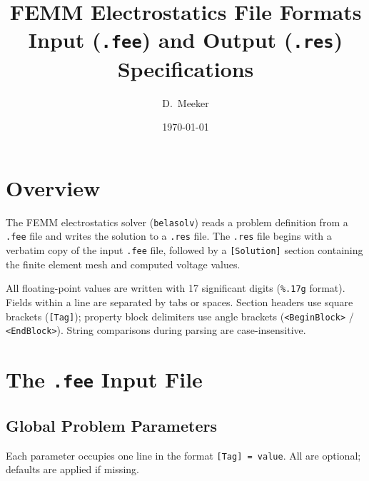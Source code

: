 \documentclass[11pt]{article}
\title{FEMM Electrostatics File Formats\\[0.5em]
\large Input (\texttt{.fee}) and Output (\texttt{.res}) Specifications}
\author{D.\ Meeker}
\date{\today}
\begin{document}
\maketitle
\tableofcontents
\newpage

\section{Overview}

The FEMM electrostatics solver (\texttt{belasolv}) reads a problem
definition from a \texttt{.fee} file and writes the solution to a
\texttt{.res} file.  The \texttt{.res} file begins with a verbatim
copy of the input \texttt{.fee} file, followed by a \texttt{[Solution]}
section containing the finite element mesh and computed voltage values.

All floating-point values are written with 17 significant digits
(\verb|%.17g| format).  Fields within a line are separated by tabs or
spaces.  Section headers use square brackets (\verb|[Tag]|); property
block delimiters use angle brackets (\verb|<BeginBlock>| /
\verb|<EndBlock>|).  String comparisons during parsing are
case-insensitive.

\section{The \texttt{.fee} Input File}

\subsection{Global Problem Parameters}

Each parameter occupies one line in the format
\verb|[Tag] = value|.  All are optional; defaults are applied if
missing.
\end{document}
